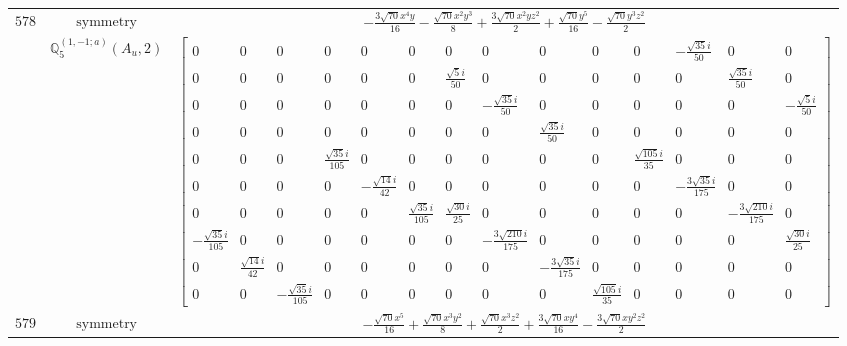 \documentclass[fleqn,8pt,landscape]{jsarticle}
\begin{document}
\begin{longtable}{ccc}
$ 578 $ & $ \text{symmetry} $ & $ - \frac{3 \sqrt{70} x^{4} y}{16} - \frac{\sqrt{70} x^{2} y^{3}}{8} + \frac{3 \sqrt{70} x^{2} y z^{2}}{2} + \frac{\sqrt{70} y^{5}}{16} - \frac{\sqrt{70} y^{3} z^{2}}{2} $ \\
$  $ & $ \mathbb{Q}_{5}^{(1,-1;a)}(A_{u},2) $ & $ \begin{bmatrix} 0 & 0 & 0 & 0 & 0 & 0 & 0 & 0 & 0 & 0 & 0 & - \frac{\sqrt{35} i}{50} & 0 & 0 \\ 0 & 0 & 0 & 0 & 0 & 0 & \frac{\sqrt{5} i}{50} & 0 & 0 & 0 & 0 & 0 & \frac{\sqrt{35} i}{50} & 0 \\ 0 & 0 & 0 & 0 & 0 & 0 & 0 & - \frac{\sqrt{35} i}{50} & 0 & 0 & 0 & 0 & 0 & - \frac{\sqrt{5} i}{50} \\ 0 & 0 & 0 & 0 & 0 & 0 & 0 & 0 & \frac{\sqrt{35} i}{50} & 0 & 0 & 0 & 0 & 0 \\ 0 & 0 & 0 & \frac{\sqrt{35} i}{105} & 0 & 0 & 0 & 0 & 0 & 0 & \frac{\sqrt{105} i}{35} & 0 & 0 & 0 \\ 0 & 0 & 0 & 0 & - \frac{\sqrt{14} i}{42} & 0 & 0 & 0 & 0 & 0 & 0 & - \frac{3 \sqrt{35} i}{175} & 0 & 0 \\ 0 & 0 & 0 & 0 & 0 & \frac{\sqrt{35} i}{105} & \frac{\sqrt{30} i}{25} & 0 & 0 & 0 & 0 & 0 & - \frac{3 \sqrt{210} i}{175} & 0 \\ - \frac{\sqrt{35} i}{105} & 0 & 0 & 0 & 0 & 0 & 0 & - \frac{3 \sqrt{210} i}{175} & 0 & 0 & 0 & 0 & 0 & \frac{\sqrt{30} i}{25} \\ 0 & \frac{\sqrt{14} i}{42} & 0 & 0 & 0 & 0 & 0 & 0 & - \frac{3 \sqrt{35} i}{175} & 0 & 0 & 0 & 0 & 0 \\ 0 & 0 & - \frac{\sqrt{35} i}{105} & 0 & 0 & 0 & 0 & 0 & 0 & \frac{\sqrt{105} i}{35} & 0 & 0 & 0 & 0 \end{bmatrix} $ \\ \hline
$ 579 $ & $ \text{symmetry} $ & $ - \frac{\sqrt{70} x^{5}}{16} + \frac{\sqrt{70} x^{3} y^{2}}{8} + \frac{\sqrt{70} x^{3} z^{2}}{2} + \frac{3 \sqrt{70} x y^{4}}{16} - \frac{3 \sqrt{70} x y^{2} z^{2}}{2} $ \\

\end{longtable}
\end{document}
